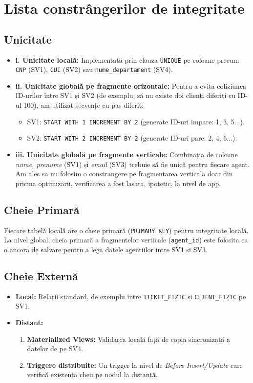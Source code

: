 \chapter{Lista constrângerilor de integritate}

\section{Unicitate}
\begin{itemize}
    \item \textbf{i. Unicitate locală:} Implementată prin clauza \texttt{UNIQUE} pe coloane precum \texttt{CNP} (SV1), \texttt{CUI} (SV2) sau \texttt{nume\_departament} (SV4).
    \item \textbf{ii. Unicitate globală pe fragmente orizontale:} Pentru a evita coliziunea ID-urilor între SV1 și SV2 (de exemplu, să nu existe doi clienți diferiți cu ID-ul 100), am utilizat secvențe cu pas diferit:
    \begin{itemize}
        \item SV1: \texttt{START WITH 1 INCREMENT BY 2} (generate ID-uri impare: 1, 3, 5...).
        \item SV2: \texttt{START WITH 2 INCREMENT BY 2} (generate ID-uri pare: 2, 4, 6...).
    \end{itemize}
    \item \textbf{iii. Unicitate globală pe fragmente verticale:} Combinația de coloane \textit{nume, prenume} (SV1) și \textit{email} (SV3) trebuie să fie unică pentru fiecare agent. Am ales sa nu folosim o constrangere pe fragmentarea verticala doar din pricina optimizarii, verificarea a fost lasata, ipotetic, la nivel de app.
\end{itemize}

\section{Cheie Primară}
Fiecare tabelă locală are o cheie primară (\texttt{PRIMARY KEY}) pentru integritate locală. La nivel global, cheia primară a fragmentelor verticale (\texttt{agent\_id}) este folosita ca o ancora de salvare pentru a lega datele agentiilor intre SV1 si SV3.

\section{Cheie Externă}
\begin{itemize}
    \item \textbf{Local:} Relații standard, de exemplu între \texttt{TICKET\_FIZIC} și \texttt{CLIENT\_FIZIC} pe SV1.
    \item \textbf{Distant:}
    \begin{enumerate}
        \item \textbf{Materialized Views:} Validarea locală față de copia sincronizată a datelor de pe SV4.
        \item \textbf{Triggere distribuite:} Un trigger la nivel de \textit{Before Insert/Update} care verifică existența cheii pe nodul la distanță.
    \end{enumerate}
\end{itemize}

